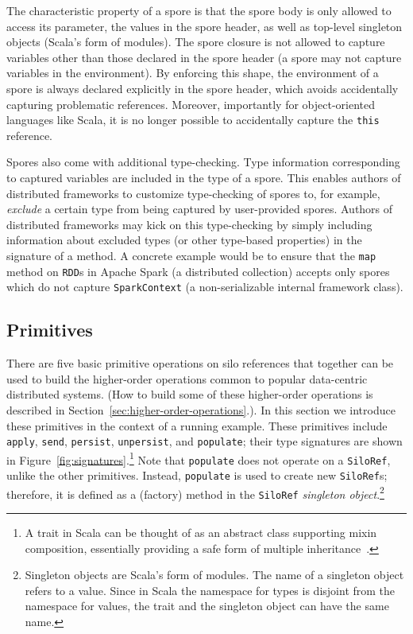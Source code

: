 \documentclass{jfp1}
\begin{document}
\vspace{3mm}
The characteristic property of a spore is that the spore body is only allowed to
access its parameter, the values in the spore header, as well as top-level
singleton objects (Scala's form of modules). The spore closure is not allowed to
capture variables other than those declared in the spore header (\ie a spore may
not capture variables in the environment). By enforcing this shape, the
environment of a spore is always declared explicitly in the spore header, which
avoids accidentally capturing problematic references. Moreover, importantly for
object-oriented languages like Scala, it is no longer possible to accidentally
capture the \verb|this| reference.

Spores also come with additional type-checking. Type information corresponding
to captured variables are included in the type of a spore. This enables authors
of distributed frameworks to customize type-checking of spores to, for example,
{\em exclude} a certain type from being captured by user-provided spores.
Authors of distributed frameworks may kick on this type-checking by simply
including information about excluded types (or other type-based properties) in
the signature of a method. A concrete example would be to ensure that the
\verb|map| method on \verb|RDD|s in Apache Spark (a distributed collection)
accepts only spores which do not capture \verb|SparkContext| (a non-serializable
internal framework class).



\subsection{Primitives}
\label{sec:primitives}

There are five basic primitive operations on silo references that
together can be used to build the higher-order operations common to
popular data-centric distributed systems. (How to build some of these
higher-order operations is described in
Section~\ref{sec:higher-order-operations}.). In this section we
introduce these primitives in the context of a running example. These
primitives include \verb|apply|, \verb|send|, \verb|persist|,
\verb|unpersist|, and \verb|populate|; their type signatures are shown
in Figure~\ref{fig:signatures}.\footnote{A trait in Scala can be
  thought of as an abstract class supporting mixin composition,
  essentially providing a safe form of multiple
  inheritance~\cite{OderskyZ05}.}  Note that \verb|populate| does not
operate on a \verb|SiloRef|, unlike the other primitives. Instead,
\verb|populate| is used to create new \verb|SiloRef|s; therefore, it
is defined as a (factory) method in the \verb|SiloRef| {\em singleton
  object}.\footnote{Singleton objects are Scala's form of modules. The
  name of a singleton object refers to a value. Since in Scala the
  namespace for types is disjoint from the namespace for values, the
  trait and the singleton object can have the same name.}
\end{document}
